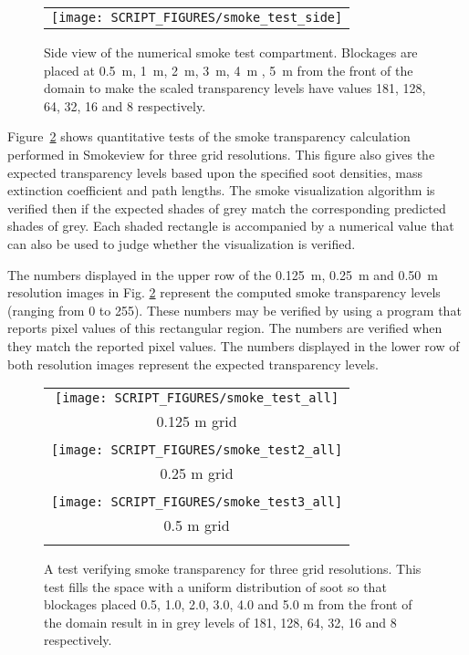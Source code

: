 \documentclass[11pt,twoside]{book}
\begin{document}
\begin{figure}[bph]
\begin{center}
 \centering
\begin{tabular}{c}
 \texttt{[image: SCRIPT\_FIGURES/smoke\_test\_side]}
 \end{tabular}
\end{center}
 \caption[Side view of the numerical smoke test compartment.]{Side view of the numerical
 smoke test compartment.  Blockages are placed at \SI{0.5}{m}, \SI{1}{m}, \SI{2}{m},
 \SI{3}{m}, \SI{4}{m} , \SI{5}{m} from the front of the domain to make the scaled transparency levels have values
 181, 128, 64, 32, 16 and 8 respectively.}
\label{figsmoketestgeom}%
\end{figure}

Figure~\ref{figsmoketest2} shows quantitative tests of the smoke transparency
calculation performed in Smokeview for three grid resolutions.
This figure also gives the expected transparency levels based upon the specified soot densities, mass extinction coefficient and path lengths.  The smoke visualization algorithm is verified then if the expected shades of grey match the corresponding predicted shades of grey.  Each shaded rectangle is accompanied by a numerical value that can also be used to judge whether the visualization is verified.

The numbers displayed in the upper row of the \SI{0.125}{m}, \SI{0.25}{m} and \SI{0.50}{m} resolution images in Fig. \ref{figsmoketest2} represent the computed smoke transparency levels (ranging from 0 to 255).  These numbers may be verified by using a
program that reports pixel values of this
rectangular region.  The numbers are verified when they match the reported pixel
values. The numbers displayed in the lower row of both resolution images represent the expected transparency levels.

\begin{figure}[bph]
\begin{center}
 \centering
\begin{tabular}{c}
 \texttt{[image: SCRIPT\_FIGURES/smoke\_test\_all]}\\
0.125 m grid\\ \\
 \texttt{[image: SCRIPT\_FIGURES/smoke\_test2\_all]} \\
0.25 m grid\\ \\
 \texttt{[image: SCRIPT\_FIGURES/smoke\_test3\_all]}\\
0.5 m grid\\ \\
 \end{tabular}
\end{center}
 \caption[A test verifying smoke transparency for three grid resolutions.]{A test verifying
 smoke transparency for three grid resolutions.  This test fills the space with a uniform distribution of soot so that blockages
 placed 0.5, 1.0, 2.0, 3.0, 4.0 and 5.0 m from the front of the domain result in
 in grey levels of  181, 128, 64, 32, 16 and 8 respectively.
 }
\label{figsmoketest2}%
\end{figure}
\end{document}

